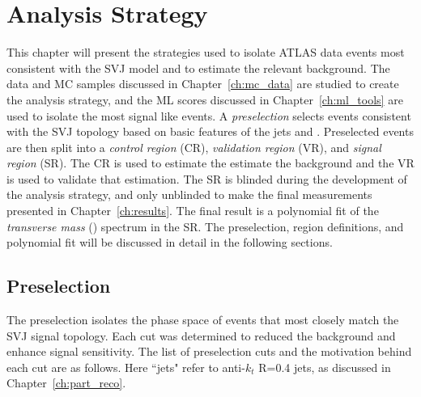 \chapter{Analysis Strategy}
\label{ch:analysis}

This chapter will present the strategies used to isolate ATLAS data events most consistent with the SVJ model and to estimate the relevant background. The data and MC samples discussed in Chapter~\ref{ch:mc_data} are studied to create the analysis strategy, and the ML scores discussed in Chapter~\ref{ch:ml_tools} are used to isolate the most signal like events. A \textit{preselection} selects events consistent with the SVJ topology based on basic features of the jets and \met. Preselected events are then split into a \textit{control region} (CR), \textit{validation region} (VR), and \textit{signal region} (SR). The CR is used to estimate the estimate the background and the VR is used to validate that estimation. The SR is blinded during the development of the analysis strategy, and only unblinded to make the final measurements presented in Chapter~\ref{ch:results}. The final result is a polynomial fit of the \textit{transverse mass} (\mt) spectrum in the SR. The preselection, region definitions, and polynomial fit will be discussed in detail in the following sections.

\section{Preselection}
\label{sec:eventsel}

The preselection isolates the phase space of events that most closely match the SVJ signal topology. Each cut was determined to reduced the background and enhance signal sensitivity.
The list of preselection cuts and the motivation behind each cut are as follows. 
Here ``jets" refer to anti-$k_t$ R=0.4 jets, as discussed in Chapter~\ref{ch:part_reco}.

